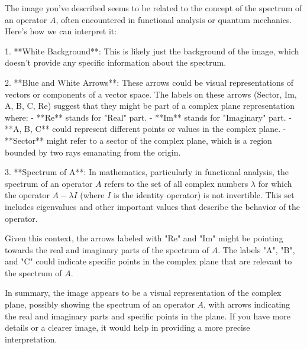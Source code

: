 The image you've described seems to be related to the concept of the spectrum of an operator \(A\), often encountered in functional analysis or quantum mechanics. Here's how we can interpret it:

1. **White Background**: This is likely just the background of the image, which doesn't provide any specific information about the spectrum.

2. **Blue and White Arrows**: These arrows could be visual representations of vectors or components of a vector space. The labels on these arrows (Sector, Im, A, B, C, Re) suggest that they might be part of a complex plane representation where:
   - **Re** stands for "Real" part.
   - **Im** stands for "Imaginary" part.
   - **A, B, C** could represent different points or values in the complex plane.
   - **Sector** might refer to a sector of the complex plane, which is a region bounded by two rays emanating from the origin.

3. **Spectrum of A**: In mathematics, particularly in functional analysis, the spectrum of an operator \(A\) refers to the set of all complex numbers \(\lambda\) for which the operator \(A - \lambda I\) (where \(I\) is the identity operator) is not invertible. This set includes eigenvalues and other important values that describe the behavior of the operator.

Given this context, the arrows labeled with "Re" and "Im" might be pointing towards the real and imaginary parts of the spectrum of \(A\). The labels "A", "B", and "C" could indicate specific points in the complex plane that are relevant to the spectrum of \(A\).

In summary, the image appears to be a visual representation of the complex plane, possibly showing the spectrum of an operator \(A\), with arrows indicating the real and imaginary parts and specific points in the plane. If you have more details or a clearer image, it would help in providing a more precise interpretation.